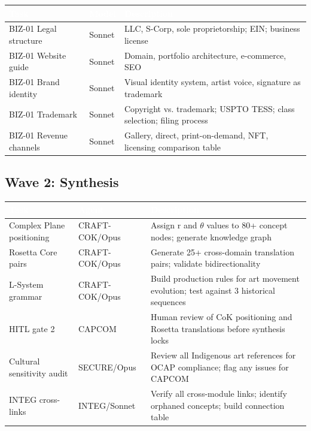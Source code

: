 \documentclass[11pt,letterpaper]{article}
\newcommand{\tableheader}[1]{\textbf{\sffamily\textcolor{white}{#1}}}
\begin{document}
\begin{tabularx}{\textwidth}{L{2.5cm}L{2cm}X}
\toprule
{}
\tableheader{Task} & \tableheader{Model} & \tableheader{Description} \\
\midrule
BIZ-01 Legal structure & Sonnet & LLC, S-Corp, sole proprietorship; EIN; business license \\
BIZ-01 Website guide & Sonnet & Domain, portfolio architecture, e-commerce, SEO \\
BIZ-01 Brand identity & Sonnet & Visual identity system, artist voice, signature as trademark \\
BIZ-01 Trademark & Sonnet & Copyright vs. trademark; USPTO TESS; class selection; filing process \\
BIZ-01 Revenue channels & Sonnet & Gallery, direct, print-on-demand, NFT, licensing comparison table \\
\bottomrule
\end{tabularx}

\subsection{Wave 2: Synthesis}

\begin{tabularx}{\textwidth}{L{3cm}L{2cm}X}
\toprule
{}
\tableheader{Task} & \tableheader{Agent} & \tableheader{Description} \\
\midrule
Complex Plane positioning & CRAFT-COK/Opus & Assign r and $\theta$ values to 80+ concept nodes; generate knowledge graph \\
Rosetta Core pairs & CRAFT-COK/Opus & Generate 25+ cross-domain translation pairs; validate bidirectionality \\
L-System grammar & CRAFT-COK/Opus & Build production rules for art movement evolution; test against 3 historical sequences \\
HITL gate 2 & CAPCOM & Human review of CoK positioning and Rosetta translations before synthesis locks \\
Cultural sensitivity audit & SECURE/Opus & Review all Indigenous art references for OCAP compliance; flag any issues for CAPCOM \\
INTEG cross-links & INTEG/Sonnet & Verify all cross-module links; identify orphaned concepts; build connection table \\
\bottomrule
\end{tabularx}
\end{document}
